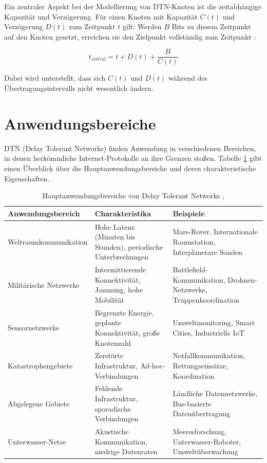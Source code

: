 \documentclass[paper=a4,fontsize=12pt,ngerman]{scrartcl}
\begin{document}
Ein zentraler Aspekt bei der Modellierung von DTN-Knoten ist die zeitabhängige Kapazität und Verzögerung. 
Für einen Knoten mit Kapazität $C(t)$ und Verzögerung $D(t)$ zum Zeitpunkt $t$ gilt: Werden $B$ Bits zu diesem Zeitpunkt auf den Knoten gesetzt, erreichen sie den Zielpunkt vollständig zum Zeitpunkt \cite[S. 16]{CBH+07}:

\begin{equation}
t_{\text{arrival}} = t + D(t) + \frac{B}{C(t)}
\end{equation}

Dabei wird unterstellt, dass sich $C(t)$ und $D(t)$ während des Übertragungsintervalls nicht wesentlich ändern.
\newpage
\section{Anwendungsbereiche}

DTN (Delay Tolerant Networks) finden Anwendung in verschiedenen Bereichen, in denen herkömmliche Internet-Protokolle an ihre Grenzen stoßen. 
Tabelle \ref{tab:applications} gibt einen Überblick über die Hauptanwendungsbereiche und deren charakteristische Eigenschaften.

\begin{table}[H]
\centering
\begin{tabular}{|p{4.5cm}|p{5.5cm}|p{5.5cm}|}
\hline
\textbf{Anwendungsbereich} & \textbf{Charakteristika} & \textbf{Beispiele} \\
\hline
Weltraumkommunikation & Hohe Latenz (Minuten bis Stunden), periodische Unterbrechungen & Mars-Rover, Internationale Raumstation, Interplanetare Sonden \\
\hline
Militärische Netzwerke & Intermittierende Konnektivität, Jamming, hohe Mobilität & Battlefield-Kommunikation, Drohnen-Netzwerke, Truppenkoordination \\
\hline
Sensornetzwerke & Begrenzte Energie, geplante Konnektivität, große Knotenzahl & Umweltmonitoring, Smart Cities, Industrielle IoT \\
\hline
Katastrophengebiete & Zerstörte Infrastruktur, Ad-hoc-Verbindungen & Notfallkommunikation, Rettungseinsätze, Koordination \\
\hline
Abgelegene Gebiete & Fehlende Infrastruktur, sporadische Verbindungen & Ländliche Datennetzwerke, Bus-basierte Datenübertragung \\
\hline
Unterwasser-Netze & Akustische Kommunikation, niedrige Datenraten & Meeresforschung, Unterwasser-Roboter, Umweltüberwachung \\
\hline
\end{tabular}
\caption{Hauptanwendungsbereiche von Delay Tolerant Networks \cite[S. 5]{Wart15}, \cite[S. 9--16]{GYL+15}}
\label{tab:applications}
\end{table}
\end{document}
